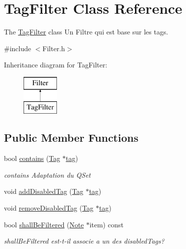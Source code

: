\hypertarget{class_tag_filter}{\section{Tag\-Filter Class Reference}
\label{class_tag_filter}
}


The \hyperlink{class_tag_filter}{Tag\-Filter} class Un Filtre qui est base sur les tags.  




{\ttfamily \#include $<$Filter.\-h$>$}

Inheritance diagram for Tag\-Filter\-:\begin{figure}[H]
\begin{center}
\leavevmode
\includegraphics[height=2.000000cm]{class_tag_filter}
\end{center}
\end{figure}
\subsection*{Public Member Functions}
\begin{DoxyCompactItemize}
\item 
bool \hyperlink{class_tag_filter_ab33782982e24ad92cf3ae2db25742150}{contains} (\hyperlink{class_tag}{Tag} $\ast$\hyperlink{_filter_8h_a7ef0ab496f57e183b484e62e2053c94fa9daab2aa897c0d2d4500bed734b0d780}{tag})
\begin{DoxyCompactList}\small\item\em contains Adaptation du Q\-Set \end{DoxyCompactList}\item 
void \hyperlink{class_tag_filter_a32b2abe00a429a9004e78dd718ceb8bb}{add\-Disabled\-Tag} (\hyperlink{class_tag}{Tag} $\ast$\hyperlink{_filter_8h_a7ef0ab496f57e183b484e62e2053c94fa9daab2aa897c0d2d4500bed734b0d780}{tag})
\item 
void \hyperlink{class_tag_filter_a2a4b83d5b2957e075e01f08d5bcd2a5a}{remove\-Disabled\-Tag} (\hyperlink{class_tag}{Tag} $\ast$\hyperlink{_filter_8h_a7ef0ab496f57e183b484e62e2053c94fa9daab2aa897c0d2d4500bed734b0d780}{tag})
\item 
bool \hyperlink{class_tag_filter_a488d669b40c37a1e489a9b25f69a3f23}{shall\-Be\-Filtered} (\hyperlink{class_note}{Note} $\ast$item) const 
\begin{DoxyCompactList}\small\item\em shall\-Be\-Filtered  est-\/t-\/il associe a un des disabled\-Tags? \end{DoxyCompactList}\end{DoxyCompactItemize}

